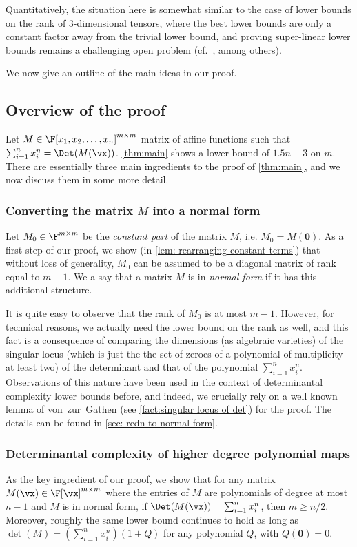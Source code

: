 Quantitatively, the situation here is somewhat similar to the case of lower bounds on the rank of 3-dimensional tensors, where the best lower bounds are only a constant factor away from the trivial lower bound, and proving super-linear lower bounds remains a challenging open problem (cf.\ \cite{AFT11,BD80,Blaser99,Shpilka01}, among others).

We now give an outline of the main ideas in our proof. 
\subsection{Overview of the proof}
Let $M \in \F[x_1, x_2, \ldots, x_n]^{m \times m}$ matrix of affine functions such that $\sum_{i = 1}^n x_i^n = \Det(M(\vx))$.  \autoref{thm:main} shows a lower bound of $1.5n - 3$ on $m$. There are essentially three main ingredients to the proof of \autoref{thm:main}, and we now discuss them in some more detail. 
\subsubsection*{Converting the matrix $M$ into a normal form}
 Let $M_0 \in \F^{m \times m}$ be the \emph{constant part} of the matrix $M$, i.e. $M_0 = M(\mathbf{0})$.  As a first step of our proof, we show (in \autoref{lem: rearranging constant terms}) that without loss of generality, $M_0$ can be assumed to be a diagonal matrix of rank equal to  $m-1$.  We a say that a matrix $M$ is in \emph{normal form} if it has this additional structure. 
 
It is quite easy to observe that the rank of $M_0$ is at most $m-1$. However, for technical reasons, we actually need the lower bound on the rank as well, and this fact is a consequence of  comparing the dimensions (as algebraic varieties)  of the singular locus (which is just the the set of  zeroes of a polynomial of multiplicity at least two) of the determinant and that of the polynomial $\sum_{i = 1}^n x_i^n$. Observations of this nature have been used in the context of determinantal complexity lower bounds before, and indeed, we crucially rely on a well known lemma of von~zur~Gathen (see \autoref{fact:singular locus of det}) for the proof. The details can be found in \autoref{sec: redn to normal form}. 
 
\subsubsection*{Determinantal complexity of higher degree polynomial maps}
As the key ingredient of our proof, we show that for any matrix $M(\vx) \in \F[\vx]^{m\times m}$ where the entries of $M$ are polynomials  of degree at most $n-1$ and $M$ is in normal form, if $\Det(M(\vx)) =\sum_{i = 1}^n x_i^n $, then $m \geq n/2$. Moreover, roughly the same lower bound continues to hold  as long as $\det(M) = \left(\sum_{i = 1}^n x_i^n\right)(1 + Q)$ for any polynomial $Q$, with $Q(\mathbf{0}) = 0$. 

